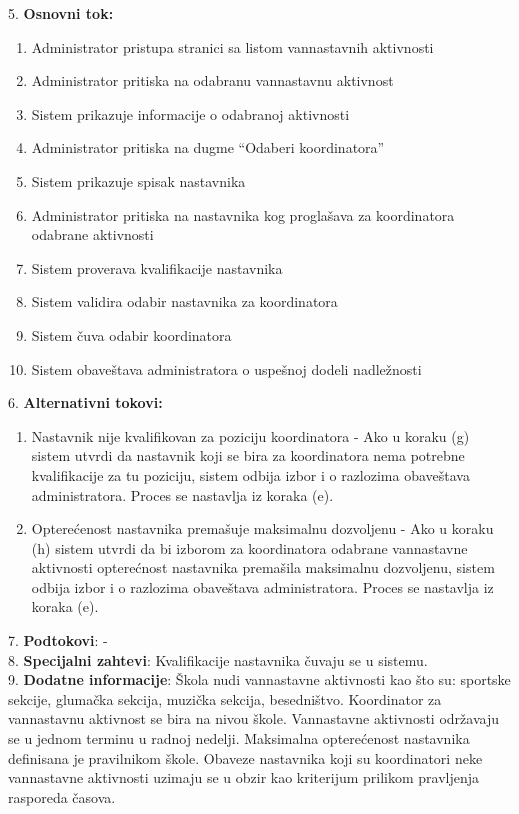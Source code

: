 \documentclass{article}
\begin{document}
5. \textbf{Osnovni tok:} 
\begin{enumerate} [label=(\alph*)]
\item Administrator pristupa stranici sa listom vannastavnih aktivnosti
\item Administrator pritiska na odabranu vannastavnu aktivnost
\item Sistem prikazuje informacije o odabranoj aktivnosti
\item Administrator pritiska na dugme ``Odaberi koordinatora''
\item Sistem prikazuje spisak nastavnika
\item Administrator pritiska na nastavnika kog proglašava za koordinatora odabrane aktivnosti
\item Sistem proverava kvalifikacije nastavnika
\item Sistem validira odabir nastavnika za koordinatora
\item Sistem čuva odabir koordinatora
\item Sistem obaveštava administratora o uspešnoj dodeli nadležnosti
\end{enumerate}

6. \textbf{Alternativni tokovi:}
\begin{enumerate} [label=(\roman*)]
    \item Nastavnik nije kvalifikovan za poziciju koordinatora - Ako u koraku (g) sistem utvrdi da nastavnik koji se bira za koordinatora nema potrebne kvalifikacije za tu poziciju, sistem odbija izbor i o razlozima obaveštava administratora. Proces se nastavlja iz koraka (e).
    \item Opterećenost nastavnika premašuje maksimalnu dozvoljenu - Ako u koraku (h) sistem utvrdi da bi izborom za koordinatora odabrane vannastavne aktivnosti opterećnost nastavnika premašila maksimalnu dozvoljenu, sistem odbija izbor i o razlozima obaveštava administratora. Proces se nastavlja iz koraka (e).
\end{enumerate}

7. \textbf{Podtokovi}: - \\

8. \textbf{Specijalni zahtevi}: Kvalifikacije nastavnika čuvaju se u sistemu. \\

9. \textbf{Dodatne informacije}: Škola nudi vannastavne aktivnosti kao što su: sportske sekcije, glumačka sekcija, muzička sekcija, besedništvo. Koordinator za vannastavnu aktivnost se bira na nivou škole. Vannastavne aktivnosti održavaju se u jednom terminu u radnoj nedelji. Maksimalna opterećenost nastavnika definisana je pravilnikom škole. Obaveze nastavnika koji su koordinatori neke vannastavne aktivnosti uzimaju se u obzir kao kriterijum prilikom pravljenja rasporeda časova. \\
\end{document}
